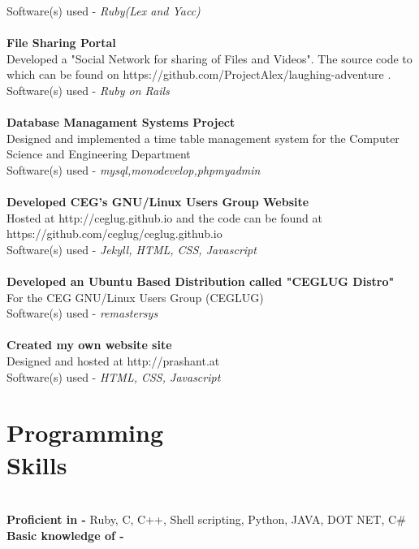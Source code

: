 \documentclass[margin,line]{resume}
\begin{document}
\begin{resume}
    Software(s) used -  \textsl{Ruby(Lex and Yacc)}\\
    \\\textbf{File Sharing Portal} \\Developed a "Social Network for sharing of Files and Videos". The source code to which can be found on https://github.com/ProjectAlex/laughing-adventure . \vspace{2mm}\\\vspace{1mm}%
    Software(s) used -  \textsl{Ruby on Rails}\\
    \\\textbf{Database Managament Systems Project} \\Designed and implemented a time table management system for the Computer Science and Engineering Department \vspace{2mm}\\\vspace{1mm}%
    Software(s) used -  \textsl{mysql,monodevelop,phpmyadmin}\\
    \\\textbf{Developed CEG's GNU/Linux Users Group Website}\\Hosted at http://ceglug.github.io and the code can be found at https://github.com/ceglug/ceglug.github.io
    \\Software(s) used -  \textsl{Jekyll, HTML, CSS, Javascript}\\
    \\\textbf{Developed an Ubuntu Based Distribution called "CEGLUG Distro"} \\For the CEG GNU/Linux Users Group (CEGLUG) \vspace{2mm}\\\vspace{1mm}%
    Software(s) used -  \textsl{remastersys}\\
    \\\textbf{Created my own website site} \\Designed and hosted at http://prashant.at \vspace{2mm}\\\vspace{1mm}%
    Software(s) used -  \textsl{HTML, CSS, Javascript}\\
    
    \section{\mysidestyle Programming\\Skills}\\ 
    \textbf{Proficient in -}  Ruby, C, C++, Shell scripting, Python, JAVA, DOT NET, C#
\\\textbf{Basic knowledge of -}  \LaTeXe


\end{resume}
\end{document}
